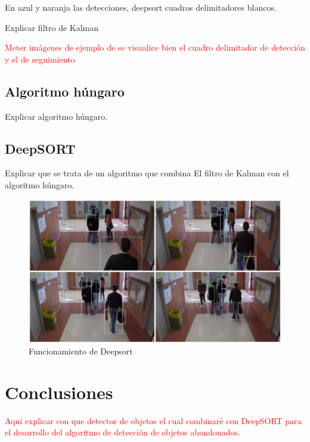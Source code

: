 En azul y naranja las detecciones, deepsort cuadros delimitadores blancos.

Explicar filtro de Kalman

\textcolor{red}{Meter imágenes de ejemplo de se visualice bien el cuadro delimitador de detección y el de seguimiento}

\subsection{Algoritmo húngaro}
\label{subsec:hungarian-algorithm}

Explicar algoritmo húngaro.

\subsection{DeepSORT}
\label{subsec:deepsort}

Explicar que se trata de un algoritmo que combina El filtro de Kalman con el algoritmo húngaro.

\begin{figure}[ht]
\centering
\includegraphics[width=1\textwidth]{img/chapters/algoritmos/deepsort-example.png}
\caption{\label{fig:tracking-example}Funcionamiento de Deepsort}
\end{figure}

\section{Conclusiones}
\label{sec:conclu-algoritmos}

\textcolor{red}{Aquí explicar con que detector de objetos el cual combinaré con DeepSORT para el desarrollo del algoritmo de detección de objetos abandonados.}
